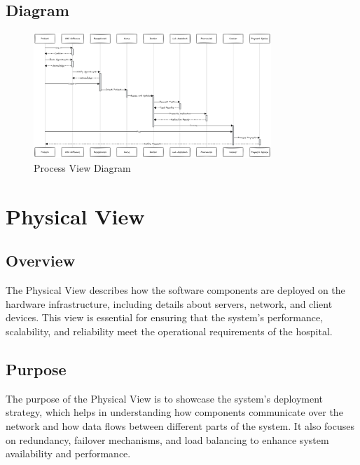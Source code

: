 \documentclass[12pt]{article}
\begin{document}
\newpage


\subsection*{Diagram}
\begin{figure}[h!]
\centering
\includegraphics[width=0.8\textwidth]{process.png}
\caption{Process View Diagram}
\end{figure}




\section*{Physical View}
\subsection*{Overview}
The Physical View describes how the software components are deployed on the hardware infrastructure, including details about servers, network, and client devices. This view is essential for ensuring that the system's performance, scalability, and reliability meet the operational requirements of the hospital.

\subsection*{Purpose}
The purpose of the Physical View is to showcase the system's deployment strategy, which helps in understanding how components communicate over the network and how data flows between different parts of the system. It also focuses on redundancy, failover mechanisms, and load balancing to enhance system availability and performance.
\end{document}
